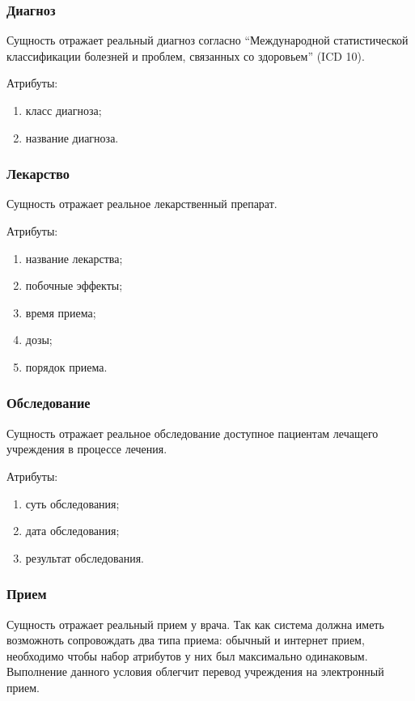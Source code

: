 \subsubsection{Диагноз}
Сущность отражает реальный диагноз согласно “Международной статистической
классификации болезней и проблем, связанных со здоровьем” (ICD 10).

Атрибуты:
\begin{enumerate}
  \item класс диагноза;
  \item название диагноза.   
\end{enumerate}

\subsubsection{Лекарство}
Сущность отражает реальное лекарственный препарат.

Атрибуты:
\begin{enumerate}
  \item название лекарства;
  \item побочные эффекты;
  \item время приема;
  \item дозы;
  \item порядок приема. 
\end{enumerate}

\subsubsection{Обследование}
Сущность отражает реальное обследование доступное пациентам лечащего учреждения
в процессе лечения.

Атрибуты:
\begin{enumerate}
  \item суть обследования; 
  \item дата обследования; 
  \item результат обследования. 
\end{enumerate}

 \subsubsection{Прием}
Сущность отражает реальный прием у врача. Так как система должна иметь
возможноть сопровождать два типа приема: обычный и интернет прием, необходимо
чтобы набор атрибутов у них был максимально одинаковым. Выполнение данного
условия облегчит перевод учреждения на электронный прием.
 
